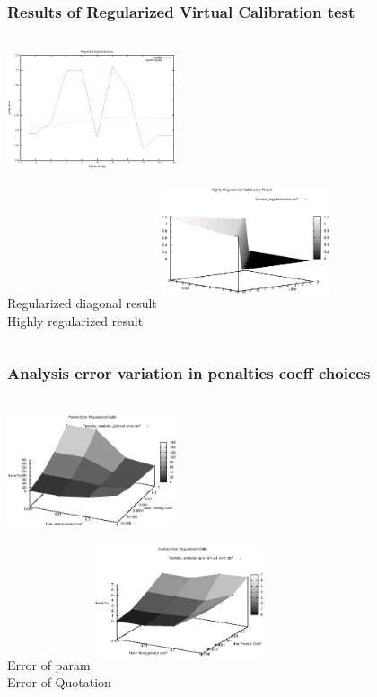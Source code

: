\documentclass[8pt]{beamer}
\begin{document}
\begin{frame}
\frametitle{Results of Regularized Virtual Calibration test}
\begin{columns}[t]
\centering
\includegraphics[width=5cm,height=3.5cm]{diag_compare} \\
Regularized diagonal result
\centering
\includegraphics[width=5cm,height=4cm]{extrem_regularization}\\
Highly regularized result
\end{columns}
\end{frame}


\begin{frame}
\frametitle{Analysis error variation in penalties coeff choices}
\begin{columns}[t]
\centering
\includegraphics[width=5cm,height=3.5cm]{penalty_analysis_gVirtual_error} \\
Error of param
\centering
\includegraphics[width=5cm,height=4cm]{penalty_analysis_quoteVirtual_error}\\
Error of Quotation
\end{columns}
\end{frame}
\end{document}
